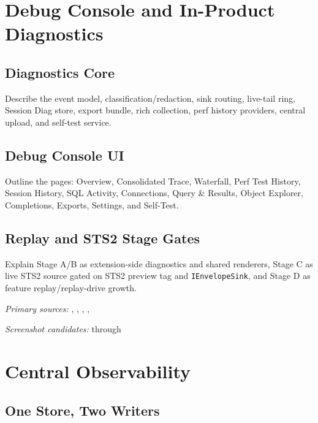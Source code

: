 \documentclass[11pt]{article}
\newcommand{\code}[1]{\texttt{#1}}
\begin{document}
\section{Debug Console and In-Product Diagnostics}

\subsection{Diagnostics Core}

Describe the event model, classification/redaction, sink routing, live-tail ring, Session Diag store, export bundle, rich collection, perf history providers, central upload, and self-test service.

\subsection{Debug Console UI}

Outline the pages: Overview, Consolidated Trace, Waterfall, Perf Test History, Session History, SQL Activity, Connections, Query \& Results, Object Explorer, Completions, Exports, Settings, and Self-Test.

\subsection{Replay and STS2 Stage Gates}

Explain Stage A/B as extension-side diagnostics and shared renderers, Stage C as live STS2 source gated on STS2 preview tag and \code{IEnvelopeSink}, and Stage D as feature replay/replay-drive growth.

\noindent\textit{Primary sources:} , , , , 

\noindent\textit{Screenshot candidates:}  through 

\section{Central Observability}

\subsection{One Store, Two Writers}
\end{document}
